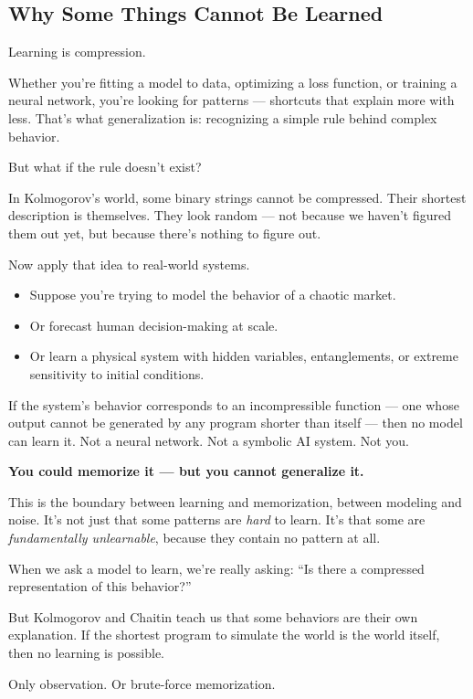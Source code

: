 \subsection{Why Some Things Cannot Be Learned}

Learning is compression.

Whether you're fitting a model to data, optimizing a loss function, or training a neural network, you're looking for patterns — shortcuts that explain more with less. That’s what generalization is: recognizing a simple rule behind complex behavior.

But what if the rule doesn’t exist?

In Kolmogorov’s world, some binary strings cannot be compressed. Their shortest description is themselves. They look random — not because we haven’t figured them out yet, but because there’s nothing to figure out.

\bigskip

Now apply that idea to real-world systems.

\begin{itemize}
    \item Suppose you’re trying to model the behavior of a chaotic market.
    \item Or forecast human decision-making at scale.
    \item Or learn a physical system with hidden variables, entanglements, or extreme sensitivity to initial conditions.
\end{itemize}

If the system's behavior corresponds to an incompressible function — one whose output cannot be generated by any program shorter than itself — then no model can learn it.  
Not a neural network. Not a symbolic AI system. Not you.

\bigskip

\textbf{You could memorize it — but you cannot generalize it.}

This is the boundary between learning and memorization, between modeling and noise.  
It’s not just that some patterns are \emph{hard} to learn.  
It’s that some are \emph{fundamentally unlearnable}, because they contain no pattern at all.

\bigskip

\begin{tcolorbox}[colback=red!5!white, colframe=red!75!black, title={Unlearnability in the Wild}]
When we ask a model to learn, we’re really asking:  
“Is there a compressed representation of this behavior?”

But Kolmogorov and Chaitin teach us that some behaviors are their own explanation.  
If the shortest program to simulate the world is the world itself,  
then no learning is possible.

Only observation. Or brute-force memorization.
\end{tcolorbox}

